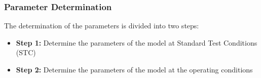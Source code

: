 \begin{frame}
    \frametitle{Parameter Determination}
    The determination of the parameters is divided into two steps:
    \begin{itemize}
        \item \textbf{Step 1:} Determine the parameters of the model at Standard Test Conditions (STC)
        \item \textbf{Step 2:} Determine the parameters of the model at the operating conditions
    \end{itemize}
\end{frame}